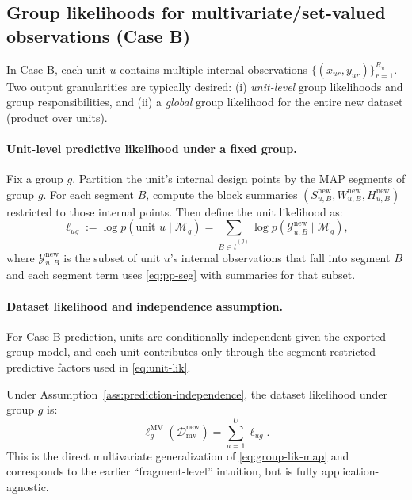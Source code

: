 \subsection{Group likelihoods for multivariate/set-valued observations (Case B)}
\label{sec:group-lik-mv}

In Case B, each unit $u$ contains multiple internal observations
$\{(x_{u r},y_{u r})\}_{r=1}^{R_u}$. Two output granularities are typically desired:
(i) \emph{unit-level} group likelihoods and group responsibilities, and (ii) a \emph{global}
group likelihood for the entire new dataset (product over units).

\paragraph{Unit-level predictive likelihood under a fixed group.}
Fix a group $g$. Partition the unit's internal design points by the MAP segments of group $g$.
For each segment $B$, compute the block summaries $(S_{u,B}^{\text{new}},W_{u,B}^{\text{new}},H_{u,B}^{\text{new}})$
restricted to those internal points. Then define the unit likelihood as:
\begin{equation}
\ell_{u g}
:= \log p(\text{unit }u \mid \mathcal{M}_g)
= \sum_{B \in \widehat{t}^{(g)}} \log p(\mathcal{Y}^{\text{new}}_{u,B}\mid \mathcal{M}_g),
\label{eq:unit-lik}
\end{equation}
where $\mathcal{Y}^{\text{new}}_{u,B}$ is the subset of unit $u$'s internal observations that
fall into segment $B$ and each segment term uses \eqref{eq:pp-seg} with summaries for that subset.

\paragraph{Dataset likelihood and independence assumption.}
\begin{assumption}
\label{ass:prediction-independence}
For Case B prediction, units are conditionally independent given the exported group model, and each
unit contributes only through the segment-restricted predictive factors used in \eqref{eq:unit-lik}.
\end{assumption}
Under Assumption~\ref{ass:prediction-independence}, the dataset likelihood under group $g$ is:
\[
\ell_g^{\text{MV}}(\mathcal{D}^{\text{new}}_{\text{mv}})=\sum_{u=1}^{U}\ell_{u g}.
\]
This is the direct multivariate generalization of \eqref{eq:group-lik-map} and corresponds to
the earlier ``fragment-level'' intuition, but is fully application-agnostic.

